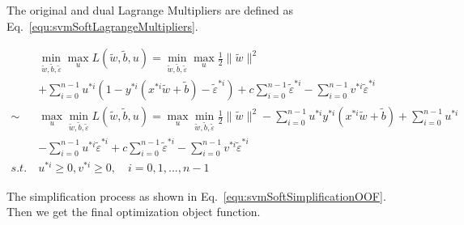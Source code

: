 \documentclass[runningheads,openany]{xhlPaper}
\begin{document}
The original and dual Lagrange Multipliers are defined as Eq.~\ref{equ:svmSoftLagrangeMultipliers}.

\begin{equation}
\label{equ:svmSoftLagrangeMultipliers}
\begin{aligned}
&\mathop {\min }\limits_{\tilde w,\tilde b,\tilde \varepsilon } \mathop {\max }\limits_u L\left( {\tilde w,\tilde b,u} \right) = \mathop {\min }\limits_{\tilde w,\tilde b,\tilde \varepsilon } \mathop {\max }\limits_u \frac{1}{2}\parallel \tilde w{\parallel ^2} \\
&+ \sum\limits_{i = 0}^{n - 1} {{u^{*i}}\left( {1 - {y^{*i}}\left( {{x^{*i}}\tilde w + \tilde b} \right) - {{\tilde \varepsilon }^{*i}}} \right)}  + c\sum\limits_{i = 0}^{n - 1} {{{\tilde \varepsilon }^{*i}}}  - \sum\limits_{i = 0}^{n - 1} {{v^{*i}}{{\tilde \varepsilon }^{*i}}} \\
 \sim &\mathop {\max }\limits_u \mathop {\min }\limits_{\tilde w,\tilde b,\tilde \varepsilon } L\left( {\tilde w,\tilde b,u} \right) = \mathop {\max }\limits_u \mathop {\min }\limits_{\tilde w,\tilde b,\tilde \varepsilon } \frac{1}{2}\parallel \tilde w{\parallel ^2} - \sum\limits_{i = 0}^{n - 1} {{u^{*i}}{y^{*i}}\left( {{x^{*i}}\tilde w + \tilde b} \right)}  + \sum\limits_{i = 0}^{n - 1} {{u^{*i}}} \\
 & - \sum\limits_{i = 0}^{n - 1} {{u^{*i}}{{\tilde \varepsilon }^{*i}}}  + c\sum\limits_{i = 0}^{n - 1} {{{\tilde \varepsilon }^{*i}}}  - \sum\limits_{i = 0}^{n - 1} {{v^{*i}}{{\tilde \varepsilon }^{*i}}} \\
s.t.\ &{u^{*i}} \ge 0,{v^{*i}} \ge 0,\quad i = 0,1,...,n - 1
\end{aligned}
\end{equation}

The simplification process as shown in Eq.~\ref{equ:svmSoftSimplificationOOF}. Then we get the final optimization object function.
\end{document}
